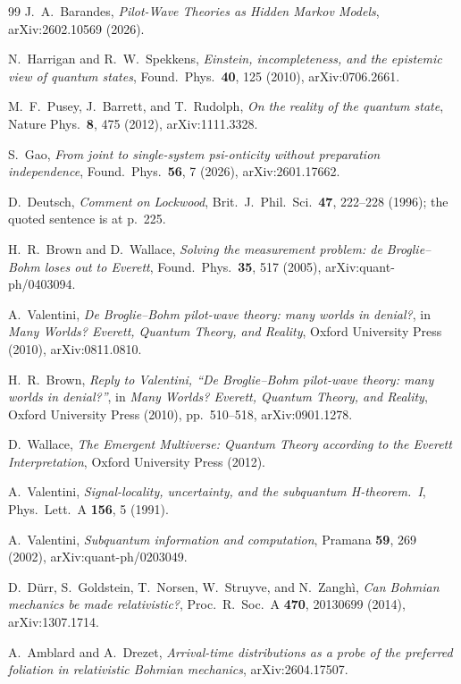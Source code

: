 \documentclass[11pt]{article}
\theoremstyle{remark}
\begin{document}
\begin{thebibliography}{99}
 J.~A.~Barandes,
\emph{Pilot-Wave Theories as Hidden Markov Models},
arXiv:2602.10569 (2026).

 N.~Harrigan and R.~W.~Spekkens,
\emph{Einstein, incompleteness, and the epistemic view of quantum
states}, Found.\ Phys.\ \textbf{40}, 125 (2010), arXiv:0706.2661.

 M.~F.~Pusey, J.~Barrett, and T.~Rudolph,
\emph{On the reality of the quantum state},
Nature Phys.\ \textbf{8}, 475 (2012), arXiv:1111.3328.

 S.~Gao,
\emph{From joint to single-system psi-onticity without preparation
independence}, Found.\ Phys.\ \textbf{56}, 7 (2026),
arXiv:2601.17662.

 D.~Deutsch,
\emph{Comment on Lockwood},
Brit.\ J.\ Phil.\ Sci.\ \textbf{47}, 222--228 (1996);
the quoted sentence is at p.~225.

 H.~R.~Brown and D.~Wallace,
\emph{Solving the measurement problem: de Broglie--Bohm loses out to
Everett}, Found.\ Phys.\ \textbf{35}, 517 (2005),
arXiv:quant-ph/0403094.

 A.~Valentini,
\emph{De Broglie--Bohm pilot-wave theory: many worlds in denial?},
in \emph{Many Worlds? Everett, Quantum Theory, and Reality},
Oxford University Press (2010), arXiv:0811.0810.

 H.~R.~Brown,
\emph{Reply to Valentini, ``De Broglie--Bohm pilot-wave theory: many
worlds in denial?''}, in \emph{Many Worlds? Everett, Quantum Theory,
and Reality}, Oxford University Press (2010), pp.~510--518,
arXiv:0901.1278.

 D.~Wallace,
\emph{The Emergent Multiverse: Quantum Theory according to the
Everett Interpretation}, Oxford University Press (2012).

 A.~Valentini,
\emph{Signal-locality, uncertainty, and the subquantum H-theorem.~I},
Phys.\ Lett.\ A \textbf{156}, 5 (1991).

 A.~Valentini,
\emph{Subquantum information and computation},
Pramana \textbf{59}, 269 (2002), arXiv:quant-ph/0203049.

 D.~D\"urr, S.~Goldstein, T.~Norsen, W.~Struyve, and
N.~Zangh\`i,
\emph{Can Bohmian mechanics be made relativistic?},
Proc.\ R.\ Soc.\ A \textbf{470}, 20130699 (2014), arXiv:1307.1714.

A.~Amblard and A.~Drezet,
\emph{Arrival-time distributions as a probe of the preferred
foliation in relativistic Bohmian mechanics},
arXiv:2604.17507.


\end{thebibliography}
\end{document}
